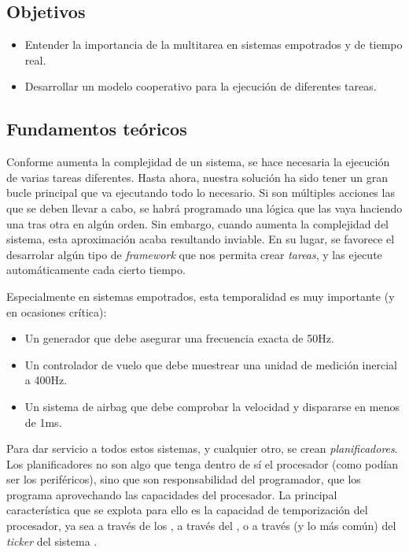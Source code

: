\documentclass[../main.tex]{subfiles}
\begin{document}

    \subsection{Objetivos}
        \begin{itemize}
            \item Entender la importancia de la multitarea en sistemas empotrados y de tiempo real.
            \item Desarrollar un modelo cooperativo para la ejecución de diferentes tareas.
        \end{itemize}

    \subsection{Fundamentos teóricos}

        Conforme aumenta la complejidad de un sistema, se hace necesaria la ejecución de varias tareas diferentes. Hasta ahora, nuestra solución ha sido tener un gran bucle principal que va ejecutando todo lo necesario. Si son múltiples acciones las que se deben llevar a cabo, se habrá programado una lógica que las vaya haciendo una tras otra en algún orden. Sin embargo, cuando aumenta la complejidad del sistema, esta aproximación acaba resultando inviable. En su lugar, se favorece el desarrolar algún tipo de \emph{framework} que nos permita crear \emph{tareas}, y las ejecute automáticamente cada cierto tiempo.

        Especialmente en sistemas empotrados, esta temporalidad es muy importante (y en ocasiones crítica):

        \begin{itemize}
            \item Un generador que debe asegurar una frecuencia exacta de 50Hz.
            \item Un controlador de vuelo que debe muestrear una unidad de medición inercial a 400Hz.
            \item Un sistema de airbag que debe comprobar la velocidad y dispararse en menos de 1ms.
        \end{itemize}

        Para dar servicio a todos estos sistemas, y cualquier otro, se crean \emph{planificadores}. Los planificadores no son algo que tenga dentro de sí el procesador (como podían ser los periféricos), sino que son responsabilidad del programador, que los programa aprovechando las capacidades del procesador. La principal característica que se explota para ello es la capacidad de temporización del procesador, ya sea a través de los  \REFMAN[18,19,20], a través del  \REFMAN[25], o a través (y lo más común) del \emph{ticker} del sistema  \PMMAN[4.4]. 
\end{document}
